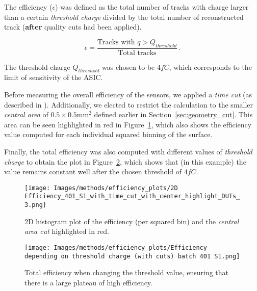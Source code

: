 The efficiency (\(\epsilon\)) was defined as the total number of tracks with charge larger than a certain \textit{threshold charge} divided by the total number of reconstructed track (\textbf{after} quality cuts had been applied).


\begin{equation*}
    \epsilon = \frac{\text{Tracks with } q>Q_{threshold}}{\text{Total tracks}}  \, .
\end{equation*}

The threshold charge \(Q_{threshold}\) was chosen to be \(4\si{fC}\), which corresponds to the limit of sensitivity of the ASIC.

Before measuring the overall efficiency of the sensors, we applied a \textit{time cut} (as described in ). Additionally, we elected to restrict the calculation to the smaller \textit{central area} of \(0.5\times0.5\unit{\milli\meter^2}\) defined earlier in Section~\ref{sec:geometry_cut}. This area can be seen highlighted in red in Figure~\ref{fig:efficiency_2D_plot}, which also shows the efficiency value computed for each individual squared binning of the surface.

Finally, the total efficiency was also computed with different values of \textit{threshold charge} to obtain the plot in Figure~\ref{fig:efficiency_depending_threshold}, which shows that (in this example) the value remains constant well after the chosen threshold of \(4\si{fC}\).

\begin{figure}[h!tbp]
    \centering
    \texttt{[image: Images/methods/efficiency\_plots/2D Efficiency\_401\_S1\_with\_time\_cut\_with\_center\_highlight\_DUTs\_3.png]}
    \captionsetup{width=\captionwidth}
    \caption{2D histogram plot of the efficiency (per squared bin) and the \textit{central area cut} highlighted in red.}
    \label{fig:efficiency_2D_plot}
\end{figure}

\begin{figure}[h!tbp]
    \centering
    \texttt{[image: Images/methods/efficiency\_plots/Efficiency depending on threshold charge (with cuts) batch 401 S1.png]}
    \captionsetup{width=\captionwidth}
    \caption{Total efficiency when changing the threshold value, ensuring that there is a large plateau of high efficiency.}
    \label{fig:efficiency_depending_threshold}
\end{figure}


